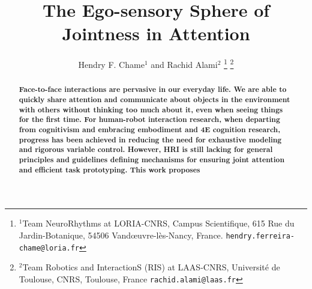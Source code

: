 \documentclass[letterpaper, 10 pt, conference]{ieeeconf}  %
\title{\LARGE \bf
	The Ego-sensory Sphere of Jointness in Attention
}
\author{Hendry F. Chame$^{1}$ and Rachid Alami$^{2}$%
	\thanks{$^{1}$Team NeuroRhythms at LORIA-CNRS, Campus Scientifique, 615 Rue du Jardin-Botanique, 54506 Vand\oe uvre-l\`es-Nancy, France.
		{\tt\small hendry.ferreira-chame@loria.fr}}%
	\thanks{$^{2}$Team Robotics and InteractionS (RIS) at LAAS-CNRS, Universit\'e de Toulouse, CNRS, Toulouse, France
		{\tt\small rachid.alami@laas.fr}}%
}
\begin{document}
	
	
	
	\maketitle
	\thispagestyle{empty}
	\pagestyle{empty}
	
	
	\begin{abstract}
		
		\small \bf Face-to-face interactions are pervasive in our everyday life. We are able to quickly share attention and communicate about objects in the environment with others without thinking too much about it, even when seeing things for the first time. For human-robot interaction research, when departing from cognitivism and embracing embodiment and 4E cognition research, progress has been achieved in reducing the need for exhaustive modeling and rigorous variable control. However, HRI is still lacking for general principles and guidelines defining mechanisms for ensuring joint attention and efficient task prototyping. This work proposes   
		
		
	\end{abstract}
	
\end{document}

